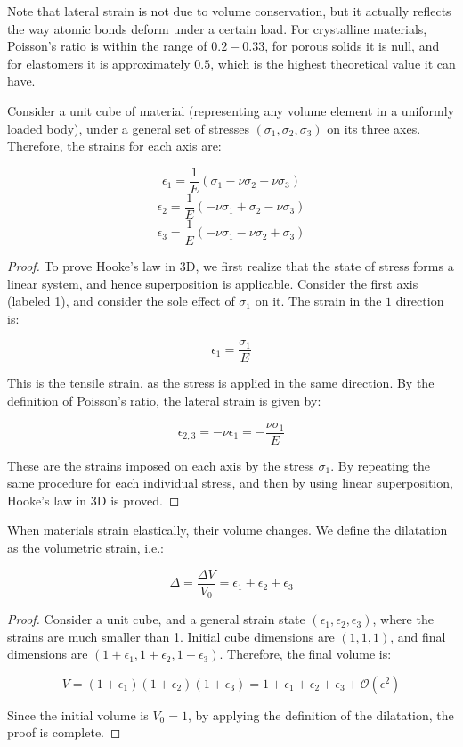 \documentclass{article}
\begin{document}
Note that lateral strain is not due to volume conservation, but it actually reflects the way atomic bonds deform under a certain load. For crystalline materials, Poisson's ratio is within the range of $0.2 - 0.33$, for porous solids it is null, and for elastomers it is approximately $0.5$, which is the highest theoretical value it can have.

\begin{proposition}
    Consider a unit cube of material (representing any volume element in a uniformly loaded body), under a general set of stresses $(\sigma_1, \sigma_2, \sigma_3)$ on its three axes. Therefore, the strains for each axis are:

    \[ \epsilon_1 = \frac{1}{E}(\sigma_1 - \nu\sigma_2 - \nu\sigma_3) \]
    \[ \epsilon_2 = \frac{1}{E}(-\nu\sigma_1 + \sigma_2 -\nu\sigma_3) \]
    \[ \epsilon_3 = \frac{1}{E}(-\nu\sigma_1 -\nu\sigma_2 + \sigma_3) \]
\end{proposition}

\begin{proof}
    To prove Hooke's law in 3D, we first realize that the state of stress forms a linear system, and hence superposition is applicable. Consider the first axis (labeled 1), and consider the sole effect of $\sigma_1$ on it. The strain in the $1$ direction is:

    \[ \epsilon_1 = \frac{\sigma_1}{E} \]

    This is the tensile strain, as the stress is applied in the same direction. By the definition of Poisson's ratio, the lateral strain is given by:

    \[ \epsilon_{2,3} = -\nu\epsilon_1 = -\frac{\nu\sigma_1}{E} \]

    These are the strains imposed on each axis by the stress $\sigma_1$. By repeating the same procedure for each individual stress, and then by using linear superposition, Hooke's law in 3D is proved.
\end{proof}

\begin{proposition}[Dilatation]
    When materials strain elastically, their volume changes. We define the dilatation as the volumetric strain, i.e.:

    \[ \Delta = \frac{\Delta V}{V_0} = \epsilon_1 + \epsilon_2 + \epsilon_3 \]
\end{proposition}

\begin{proof}
    Consider a unit cube, and a general strain state $(\epsilon_1, \epsilon_2, \epsilon_3)$, where the strains are much smaller than 1. Initial cube dimensions are $(1, 1, 1)$, and final dimensions are $(1 + \epsilon_1, 1 + \epsilon_2, 1 + \epsilon_3)$. Therefore, the final volume is:

    \[ V = (1 + \epsilon_1)(1 + \epsilon_2)(1 + \epsilon_3) = 1 + \epsilon_1 + \epsilon_2 + \epsilon_3 + \mathcal{O}(\epsilon^2) \]

    Since the initial volume is $V_0 = 1$, by applying the definition of the dilatation, the proof is complete.
\end{proof}
\end{document}
